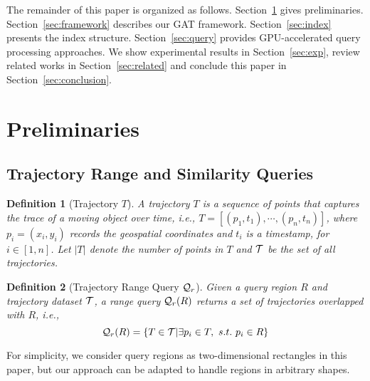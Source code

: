 \documentclass[10pt,conference,letterpaper]{IEEEtran}
\newcommand{\frname}{GAT\xspace }
\newcommand{\rangeq}{{{\cal Q}_r}\xspace}
\newcommand{\alltraj}{{{\cal T}}\xspace}
\newtheorem{definition}{Definition}
\begin{document}
The remainder of this paper is organized as follows. Section~\ref{sec:prelim} gives preliminaries. Section~\ref{sec:framework} describes our \frname framework. Section~\ref{sec:index} presents the index structure. Section~\ref{sec:query} provides GPU-accelerated query processing approaches. We show experimental results in Section~\ref{sec:exp}, review related works in Section~\ref{sec:related} and conclude this paper in Section~\ref{sec:conclusion}.




\section{Preliminaries}\label{sec:prelim}


\subsection{Trajectory Range and Similarity Queries}

\begin{definition}[Trajectory $T$]\label{def:traj}
	A trajectory $T$ is a sequence of points that captures the trace of a moving object over time, i.e., $T=[(p_1, t_1), \cdots, (p_n, t_n) ]$, where $p_i=(x_i, y_i)$ records the geospatial coordinates and $t_i$ is a timestamp, for $i\in[1,n]$. Let $|T|$ denote the number of points in $T$ and $\alltraj$ be the set of all trajectories.
\end{definition}

\begin{definition}[Trajectory Range Query $\rangeq$]\label{def:range}
	Given a query region $R$ and trajectory dataset $\alltraj$, a range query $\rangeq(R)$ returns a set of trajectories overlapped with $R$, i.e.,
	\begin{equation}\label{eq:range}
	\small
	\rangeq(R) = \{ T\in \alltraj | \exists p_i\in T, ~s.t. ~p_i\in R\}
	\end{equation}
\end{definition}
For simplicity, we consider query regions as two-dimensional rectangles in this paper, but our approach can be adapted to handle regions in arbitrary shapes.
\end{document}
